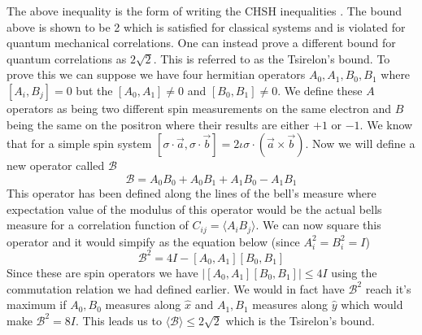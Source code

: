 The above inequality is the form of writing the CHSH inequalities \cite{chsh}. The bound above is shown to be 2 which is satisfied for classical systems and is violated for quantum mechanical correlations. One can instead prove a different bound for quantum correlations as $2\sqrt{2}$. This is referred to as the Tsirelon's bound. To prove this we can suppose we have four hermitian operators $A_0,A_1,B_0,B_1$ where $[A_i,B_j] = 0$ but the $[A_0,A_1] \neq 0$ and $[B_0,B_1] \neq 0$. We define these $A$ operators as being two different spin measurements on the same electron and $B$ being the same on the positron where their results are either $+1$ or $-1$. We know that for a simple spin system $[\sigma\cdot\vec{a},\sigma\cdot\vec{b}] = 2\iota\sigma\cdot(\vec{a}\times\vec{b})$. Now we will define a new operator called $\mathcal{B}$
$$\mathcal{B} = A_0B_0 + A_0B_1 + A_1B_0 - A_1B_1$$
This operator has been defined along the lines of the bell's measure where expectation value of the modulus of this operator would be the actual bells measure for a correlation function of $C_{ij} = \langle A_iB_j\rangle$. We can now square this operator and it would simpify as the equation below (since $A_i^2 = B_i^2 = I$)
$$\mathcal{B}^2 = 4I - [A_0,A_1][B_0,B_1]$$
Since these are spin operators we have $|[A_0,A_1][B_0,B_1]| \leq 4I$ using the commutation relation we had defined earlier. We would in fact have $\mathcal{B}^2$ reach it's maximum if $A_0,B_0$ measures along $\hat{x}$ and $A_1,B_1$ measures along $\hat{y}$ which would make $\mathcal{B}^2 = 8I$. This leads us to $\langle \mathcal{B}\rangle \leq 2\sqrt{2}$ which is the Tsirelon's bound. 

